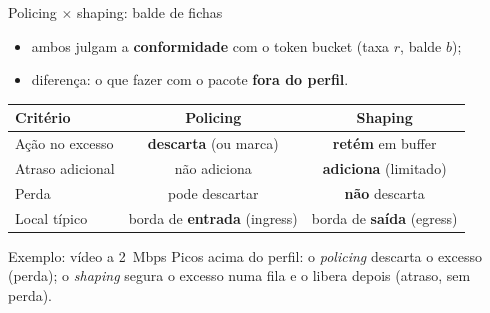 \documentclass[aspectratio=169,11pt]{beamer}
\begin{document}
\begin{frame}{Policing $\times$ shaping: balde de fichas}
  \begin{itemize}
    \item ambos julgam a \textbf{conformidade} com o token bucket (taxa $r$, balde $b$);
    \item diferença: o que fazer com o pacote \textbf{fora do perfil}.
  \end{itemize}
  \begin{center}
    \scriptsize
    \begin{tabular}{@{}lcc@{}}
      \toprule
      \textbf{Critério} & \textbf{Policing} & \textbf{Shaping}\\
      \midrule
      Ação no excesso & \textbf{descarta} (ou marca) & \textbf{retém} em buffer\\
      Atraso adicional & não adiciona & \textbf{adiciona} (limitado)\\
      Perda & pode descartar & \textbf{não} descarta\\
      Local típico & borda de \textbf{entrada} (ingress) & borda de \textbf{saída} (egress)\\
      \bottomrule
    \end{tabular}
  \end{center}
  \begin{exampleblock}{Exemplo: vídeo a 2~Mbps}
    Picos acima do perfil: o \emph{policing} descarta o excesso (perda); o \emph{shaping} segura o excesso numa fila e o libera depois (atraso, sem perda).
  \end{exampleblock}
\end{frame}
\end{document}
